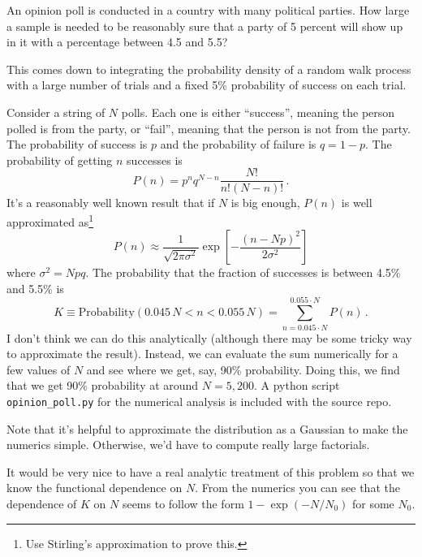 

An opinion poll is conducted in a country with many political parties.
How large a sample is needed to be reasonably sure that a party of 5 percent will show up in it with a percentage between 4.5 and 5.5?


This comes down to integrating the probability density of a random walk process with a large number of trials and a fixed 5\% probability of success on each trial.

Consider a string of $N$ polls.
Each one is either ``success'', meaning the person polled is from the party, or ``fail'', meaning that the person is not from the party.
The probability of success is $p$ and the probability of failure is $q = 1 - p$.
The probability of getting $n$ successes is
\begin{equation*}
  P(n) = p^n q^{N-n} \frac{N!}{n! (N-n)!} \, .
\end{equation*}
It's a reasonably well known result that if $N$ is big enough, $P(n)$ is well approximated as\footnote{Use Stirling's approximation to prove this.}
\begin{equation*}
  P(n) \approx \frac{1}{\sqrt{2\pi \sigma^2}} \exp \left[ - \frac{(n - Np)^2}{2 \sigma^2}\right]
\end{equation*}
where $\sigma^2 = Npq$.
The probability that the fraction of successes is between 4.5\% and 5.5\% is
\begin{equation*}
  K \equiv \text{Probability}(0.045\,N < n < 0.055\,N) = \sum_{n=0.045 \cdot N}^{0.055 \cdot N} P(n)
  \, .
\end{equation*}
I don't think we can do this analytically (although there may be some tricky way to approximate the result).
Instead, we can evaluate the sum numerically for a few values of $N$ and see where we get, say, 90\% probability.
Doing this, we find that we get 90\% probability at around $N=5,200$.
A python script \texttt{opinion\_poll.py} for the numerical analysis is included with the source repo.

Note that it's helpful to approximate the distribution as a Gaussian to make the numerics simple.
Otherwise, we'd have to compute really large factorials.

It would be very nice to have a real analytic treatment of this problem so that we know the functional dependence on $N$.
From the numerics you can see that the dependence of $K$ on $N$ seems to follow the form $1 - \exp(-N/N_0)$ for some $N_0$.
